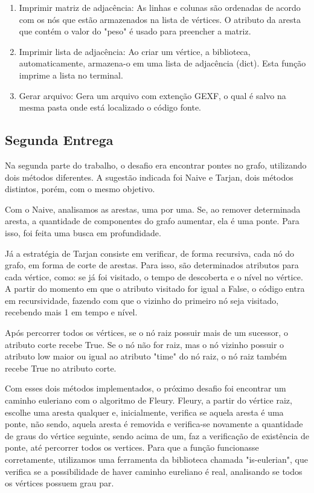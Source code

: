 \documentclass[12pt]{article}
\begin{document}
\begin{enumerate}[itemsep=8pt,parsep=8pt]
    \item Imprimir matriz de adjacência: As linhas e colunas são ordenadas de acordo com os nós que estão armazenados na lista de vértices. O atributo da aresta que contém o valor do "peso" é usado para preencher a matriz.
    
    \item Imprimir lista de adjacência: Ao criar um vértice, a biblioteca, automaticamente, armazena-o em uma lista de adjacência (dict). Esta função imprime a lista no terminal.
    
    \item Gerar arquivo: Gera um arquivo com extenção GEXF, o qual é salvo na mesma pasta onde está localizado o código fonte.
\end{enumerate}

\subsection{Segunda Entrega}
Na segunda parte do trabalho, o desafio era encontrar pontes no grafo, utilizando dois métodos diferentes. A sugestão indicada foi Naive e Tarjan, dois métodos distintos, porém, com o mesmo objetivo.

Com o Naive, analisamos as arestas, uma por uma. Se, ao remover determinada aresta, a quantidade de componentes do grafo aumentar, ela é uma ponte. Para isso, foi feita uma busca em profundidade.

Já a estratégia de Tarjan consiste em verificar, de forma recursiva, cada nó do grafo, em forma de corte de arestas. Para isso, são determinados atributos para cada vértice, como: se já foi visitado, o tempo de descoberta e o nível no vértice. A partir do momento em que o atributo visitado for igual a False, o código entra em recursividade, fazendo com que o vizinho do primeiro nó seja visitado, recebendo mais 1 em tempo e nível.

Após percorrer todos os vértices, se o nó raiz possuir mais de um sucessor, o atributo corte recebe True. Se o nó não for raiz, mas o nó vizinho possuir o atributo low maior ou igual ao atributo "time" do nó raiz, o nó raiz também recebe True no atributo corte.

Com esses dois métodos implementados, o próximo desafio foi encontrar um caminho euleriano com o algoritmo de Fleury. Fleury, a partir do vértice raiz, escolhe uma aresta qualquer e, inicialmente, verifica se aquela aresta é uma ponte, não sendo, aquela aresta é removida e verifica-se novamente a quantidade de graus do vértice seguinte, sendo acima de um, faz a verificação de existência de ponte, até percorrer todos os vertices. Para que a função funcionasse corretamente, utilizamos uma ferramenta da biblioteca chamada "is-eulerian", que verifica se a possibilidade de haver caminho eureliano é real, analisando se todos os vértices possuem grau par.
\end{document}
